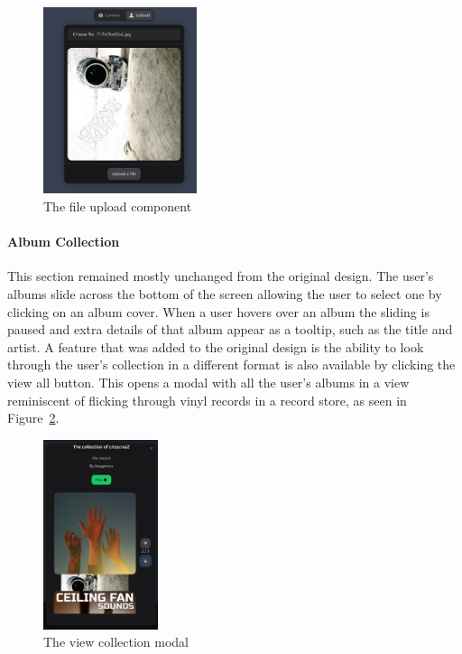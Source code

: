 \begin{figure} [H]
    \centering
    \includegraphics[width=0.4\textwidth]{figures/upload_component.png}
    \caption{The file upload component}
    \label{fig:upload_component}
\end{figure}

\paragraph{Album Collection}
This section remained mostly unchanged from the original design. The user's albums slide across the bottom of the screen allowing the user to select one by clicking on an album cover. When a user hovers over an album the sliding is paused and extra details of that album appear as a tooltip, such as the title and artist.
A feature that was added to the original design is the ability to look through the user's collection in a different format is also available by clicking the view all button. This opens a modal with all the user's albums in a view reminiscent of flicking through vinyl records in a record store, as seen in Figure~\ref{fig:collection_flick_through}.

\begin{figure} [H]
    \centering
    \includegraphics[width=0.3\textwidth]{figures/collection_flick_through.png}
    \caption{The view collection modal}
    \label{fig:collection_flick_through}
\end{figure}

